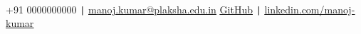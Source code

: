 \begin{flushleft}
    \\ \vspace{5pt}
    \small +91 0000000000 \quad
    {\texttt{|} \quad \href{mailto:manoj.kumar@plaksha.edu.in}{\underline{manoj.kumar@plaksha.edu.in}}} \quad
    {{\href{https://github.com/kumar-manoj}{\underline{GitHub}}}} \quad
    {\texttt{|} \quad \href{https://www.linkedin.com/in/manoj-kumar}{\underline{linkedin.com/manoj-kumar}}} 
\end{flushleft}
\vspace{-20pt}